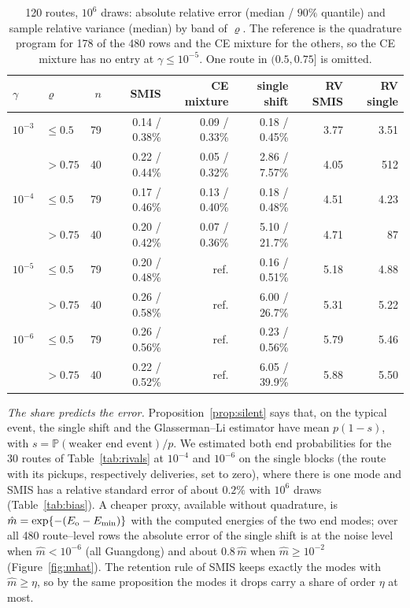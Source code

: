 \documentclass[11pt]{article}
\theoremstyle{definition}
\theoremstyle{remark}
\renewcommand{\P}{\mathbb{P}}
\begin{document}
\begin{table}[t]
\centering\small
\caption{120 routes, $10^6$ draws: absolute relative error (median / $90\%$ quantile)
and sample relative variance (median) by band of $\varrho$. The reference is the
quadrature program for 178 of the 480 rows and the CE mixture for the others, so the CE
mixture has no entry at $\gamma\le10^{-5}$. One route in $(0.5,0.75]$ is omitted.}
\label{tab:routes}
\begin{tabular}{llrrrrrr}
\toprule
$\gamma$ & $\varrho$ & $n$ & SMIS & CE mixture & single shift & RV SMIS & RV single \\
\midrule
$10^{-3}$ & $\le0.5$ & 79 & 0.14 / 0.38\% & 0.09 / 0.33\% & 0.18 / 0.45\% & 3.77 & 3.51 \\
          & $>0.75$  & 40 & 0.22 / 0.44\% & 0.05 / 0.32\% & 2.86 / 7.57\% & 4.05 & 512 \\
$10^{-4}$ & $\le0.5$ & 79 & 0.17 / 0.46\% & 0.13 / 0.40\% & 0.18 / 0.48\% & 4.51 & 4.23 \\
          & $>0.75$  & 40 & 0.20 / 0.42\% & 0.07 / 0.36\% & 5.10 / 21.7\% & 4.71 & 87 \\
$10^{-5}$ & $\le0.5$ & 79 & 0.20 / 0.48\% & ref. & 0.16 / 0.51\% & 5.18 & 4.88 \\
          & $>0.75$  & 40 & 0.26 / 0.58\% & ref. & 6.00 / 26.7\% & 5.31 & 5.22 \\
$10^{-6}$ & $\le0.5$ & 79 & 0.26 / 0.56\% & ref. & 0.23 / 0.56\% & 5.79 & 5.46 \\
          & $>0.75$  & 40 & 0.22 / 0.52\% & ref. & 6.05 / 39.9\% & 5.88 & 5.50 \\
\bottomrule
\end{tabular}
\end{table}

\emph{The share predicts the error.} Proposition~\ref{prop:silent} says that, on the
typical event, the single shift and the Glasserman--Li estimator have mean
$p(1-s)$, with $s=\P(\text{weaker end event})/p$. We estimated both end probabilities for the 30 routes of
Table~\ref{tab:rivals} at $10^{-4}$ and $10^{-6}$ on the single blocks (the route with its
pickups, respectively deliveries, set to zero), where there is one mode and SMIS has a
relative standard error of about $0.2\%$ with $10^6$ draws (Table~\ref{tab:bias}). 
A cheaper proxy, available without quadrature, is
$\hat m=\exp\{-(E_{\rm o}-E_{\min})\}$ with the computed energies of the two end modes; over
all 480 route--level rows the absolute error of the single shift is at the noise level
when $\hat m<10^{-6}$ (all Guangdong) and about $0.8\,\hat m$ when $\hat m\ge10^{-2}$
(Figure~\ref{fig:mhat}). The retention rule of SMIS keeps exactly the modes with
$\hat m\ge\eta$, so by the same proposition the modes it drops carry a share of order
$\eta$ at most.
\end{document}
